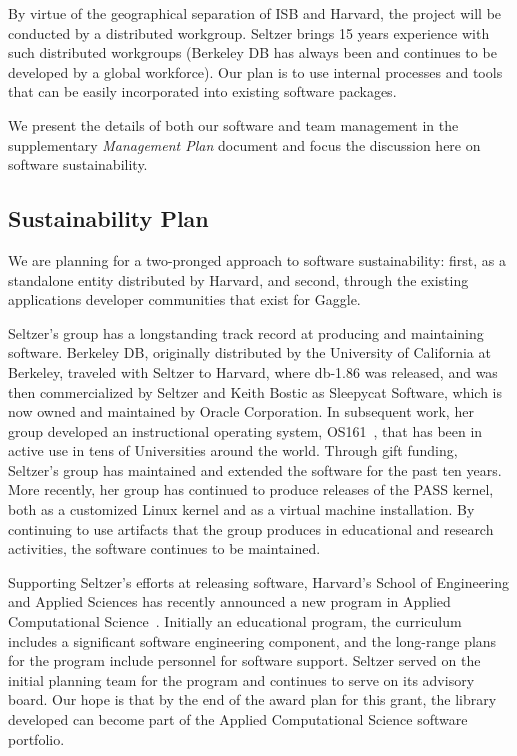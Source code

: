 \documentclass[10pt]{article}
\begin{document}


By virtue of the geographical separation of ISB and Harvard, the project
will be conducted by a distributed workgroup.
Seltzer brings 15 years experience with such distributed workgroups
(Berkeley DB has always been and continues to be developed by a global
workforce).
Our plan is to use internal processes and tools that can be easily
incorporated into existing software packages.

We present the details of both our software and team management in the
supplementary \emph{Management Plan} document and focus the discussion
here on software sustainability.

\subsection{Sustainability Plan}

We are planning for a two-pronged approach to software sustainability:
first, as a standalone entity distributed by Harvard, and
second, through the existing applications developer communities that
exist for Gaggle.

Seltzer's group has a longstanding track record at producing and
maintaining software.
Berkeley DB, originally distributed by the University of California
at Berkeley, traveled with Seltzer to Harvard, where db-1.86 was
released, and was then commercialized by Seltzer and Keith Bostic as
Sleepycat Software, which is now owned and maintained by Oracle
Corporation.
In subsequent work, her group developed an instructional operating
system, OS161~\cite{os161}, that has been in active use in tens of
Universities around the world.
Through gift funding, Seltzer's group has maintained and extended
the software for the past ten years.
More recently, her group has continued to produce releases of the
PASS kernel, both as a customized Linux kernel and as a virtual
machine installation.
By continuing to use artifacts that the group produces in educational
and research activities, the software continues to be maintained.

Supporting Seltzer's efforts at releasing software, Harvard's School of
Engineering and Applied Sciences has recently announced a new program
in Applied Computational Science~\cite{iacs}.
Initially an educational program, the curriculum includes a significant
software engineering component, and the long-range plans for the
program include personnel for software support.
Seltzer served on the initial  planning team for the program and
continues to serve on its advisory board.
Our hope is that by the end of the award plan for this grant, the
library developed can become part of the Applied Computational
Science software portfolio.
\end{document}
